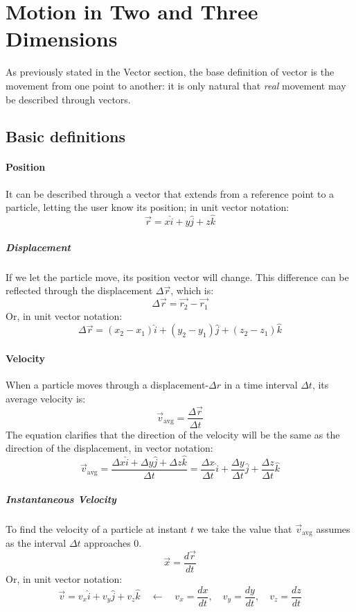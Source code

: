 \documentclass{scrartcl}
\begin{document}
    \section{Motion in Two and Three Dimensions} As previously stated in the Vector section, the base definition of vector is the movement from one point to another: it is only natural that \emph{real} movement may be described through vectors.
    \subsection{Basic definitions}
    \paragraph{Position} It can be described through a vector that extends from a reference point to a particle, letting the user know its position; in unit vector notation:
    \begin{equation}
        \vec{r} = x\hat{i}+y\hat{j}+z\hat{k}
    \end{equation}
    \subparagraph{Displacement} If we let the particle move, its position vector will change. This difference can be reflected through the displacement $\Delta\vec{r}$, which is:
    \begin{equation}
        \Delta\vec{r}= \vec{r_2} - \vec{r_1}
    \end{equation}
    Or, in unit vector notation:
    \begin{equation}
        \Delta\vec{r} = (x_2 - x_1) \hat{i} + (y_2 - y_1) \hat{j} + (z_2 - z_1) \hat{k}
    \end{equation}
    \paragraph{Velocity} When a particle moves through a displacement-$\Delta r$ in a time interval $\Delta t$, its average velocity is:
    \begin{equation}
        \vec{v}_{\mathrm{avg}} = \frac{\Delta\vec{r}}{\Delta t}
    \end{equation}
    The equation clarifies that the direction of the velocity will be the same as the direction of the displacement, in vector notation:
    \begin{equation}
        \vec{v}_{\mathrm{avg}} = \frac{\Delta x \hat{i} + \Delta y \hat{j} + \Delta z \hat{k}}{\Delta t} = \frac{\Delta x}{\Delta t} \hat{i} + \frac{\Delta y}{\Delta t} \hat{j} + \frac{\Delta z}{\Delta t} \hat{k}
    \end{equation}
    \subparagraph{Instantaneous Velocity} To find the velocity of a particle at instant $t$ we take the value that $\vec{v}_{\mathrm{avg}}$ assumes as the interval $\Delta t$ approaches $0$.
    \begin{equation}
        \vec{x} = \frac{d\vec{r}}{dt}
    \end{equation}
    Or, in unit vector notation:
    \begin{equation}
        \vec{v} = v_x \hat{i} + v_y \hat{j} + v_z \hat{k}\quad \leftarrow\quad v_x= \frac{dx}{dt},\quad v_y= \frac{dy}{dt},\quad v_z= \frac{dz}{dt}
    \end{equation}
\end{document}
